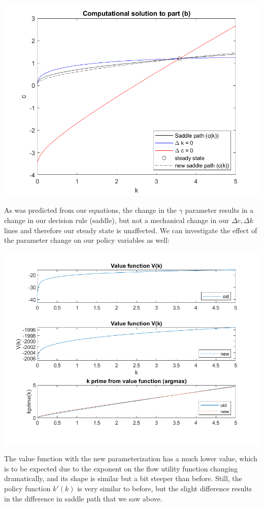 \documentclass[11pt]{article} %
\begin{document}
\includegraphics{partB}

As was predicted from our equations, the change in the $\gamma$ parameter results in a change in our decision rule (saddle), but not a mechanical change in our $\Delta c,\Delta k$ lines and therefore our steady state is unaffected. We can investigate the effect of the parameter change on our policy variables as well:

\includegraphics{partB2}

The value function with the new parameterization has a much lower value, which is to be expected due to the exponent on the flow utility function changing dramatically, and its shape is similar but a bit steeper than before. Still, the policy function $k'(k)$ is very similar to before, but the slight difference results in the difference in saddle path that we saw above.
\end{document}
